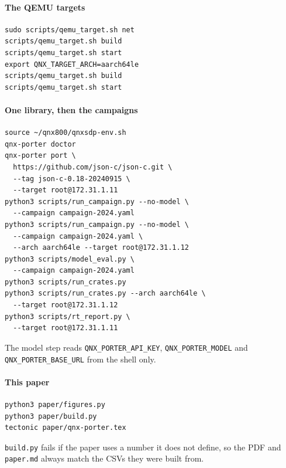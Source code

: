 \documentclass[conference]{IEEEtran}
\begin{document}
\paragraph{The QEMU targets}
\begin{verbatim}
sudo scripts/qemu_target.sh net
scripts/qemu_target.sh build
scripts/qemu_target.sh start
export QNX_TARGET_ARCH=aarch64le
scripts/qemu_target.sh build
scripts/qemu_target.sh start
\end{verbatim}

\paragraph{One library, then the campaigns}
\begin{verbatim}
source ~/qnx800/qnxsdp-env.sh
qnx-porter doctor
qnx-porter port \
  https://github.com/json-c/json-c.git \
  --tag json-c-0.18-20240915 \
  --target root@172.31.1.11
python3 scripts/run_campaign.py --no-model \
  --campaign campaign-2024.yaml
python3 scripts/run_campaign.py --no-model \
  --campaign campaign-2024.yaml \
  --arch aarch64le --target root@172.31.1.12
python3 scripts/model_eval.py \
  --campaign campaign-2024.yaml
python3 scripts/run_crates.py
python3 scripts/run_crates.py --arch aarch64le \
  --target root@172.31.1.12
python3 scripts/rt_report.py \
  --target root@172.31.1.11
\end{verbatim}
The model step reads \texttt{QNX\_PORTER\_API\_KEY}, \texttt{QNX\_PORTER\_MODEL} and \texttt{QNX\_PORTER\_BASE\_URL}
from the shell only.

\paragraph{This paper}
\begin{verbatim}
python3 paper/figures.py
python3 paper/build.py
tectonic paper/qnx-porter.tex
\end{verbatim}
\texttt{build.py} fails if the paper uses a number it does not define, so the PDF and \texttt{paper.md} always
match the CSVs they were built from.
\end{document}
